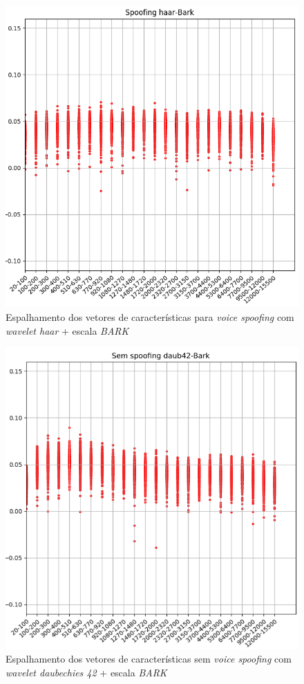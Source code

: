 \begin{figure}[!h]
	\centering
	\includegraphics[width=.70\linewidth, height=.68\linewidth]{images/results/barkVersusMel/spoofingHaarBark}
	\caption{Espalhamento dos vetores de características para \textit{voice spoofing} com \textit{wavelet haar} + escala \textit{BARK} }
	\label{fig:spoofinghaarbark}
\end{figure}
\begin{figure}[!h]
	\centering
	\includegraphics[width=.70\linewidth, height=.68\linewidth]{images/results/barkVersusMel/liveDaub42Bark}
	\caption{Espalhamento dos vetores de características sem \textit{voice spoofing} com \textit{wavelet daubechies 42} + escala \textit{BARK} }
	\label{fig:livedaub42bark}
\end{figure}
